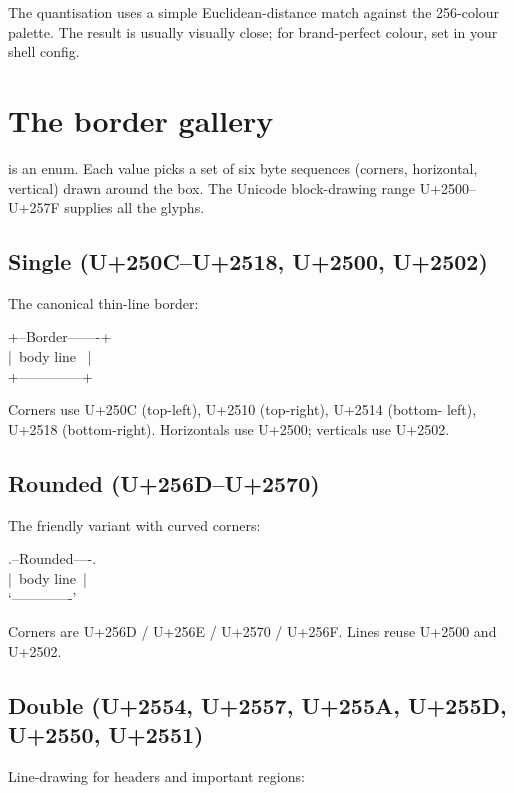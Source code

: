 The quantisation uses a simple Euclidean-distance match against
the 256-colour palette. The result is usually visually close;
for brand-perfect colour, set  in your
shell config.

\section{The border gallery}

 is an enum. Each value picks a set of six
byte sequences (corners, horizontal, vertical) drawn around the
box. The Unicode block-drawing range
U+2500--U+257F supplies all the glyphs.

\subsection*{Single (U+250C--U+2518, U+2500, U+2502)}

The canonical thin-line border:

\begin{terminalbox}
+--Border-------+\\
|\, body line  \, |\\
+--------------+
\end{terminalbox}

Corners use U+250C (top-left), U+2510 (top-right), U+2514 (bottom-
left), U+2518 (bottom-right). Horizontals use U+2500; verticals
use U+2502.

\subsection*{Rounded (U+256D--U+2570)}

The friendly variant with curved corners:

\begin{terminalbox}
.--Rounded----.\\
|\, body line\, |\\
`-------------'
\end{terminalbox}

Corners are U+256D / U+256E / U+2570 / U+256F. Lines reuse
U+2500 and U+2502.

\subsection*{Double (U+2554, U+2557, U+255A, U+255D, U+2550, U+2551)}

Line-drawing for headers and important regions:

